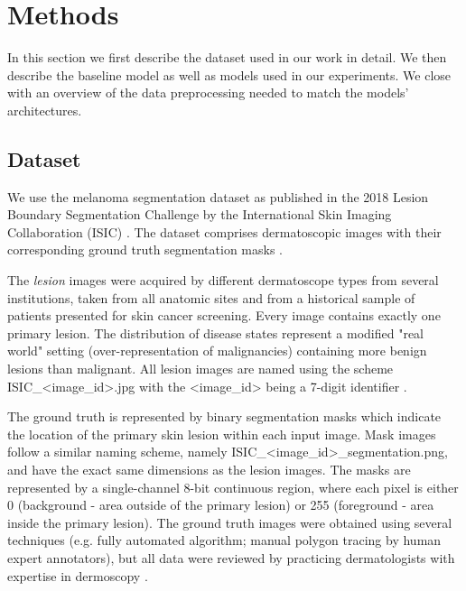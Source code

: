 \section{Methods}
In this section we first describe the dataset used in our work in detail. We then describe the baseline model as well as models used in our experiments. We close with an overview of the data preprocessing needed to match the models’ architectures.

\subsection{Dataset}
We use the melanoma segmentation dataset as published in the 2018 Lesion Boundary Segmentation Challenge by the International Skin Imaging Collaboration (ISIC) \citep{isic-2018-segmentation}. The dataset comprises dermatoscopic images with their corresponding ground truth segmentation masks \citep{ensambles-2016-codella}.

\par
The \emph{lesion} images were acquired by different dermatoscope types from several institutions, taken from all anatomic sites and from a historical sample of patients presented for skin cancer screening. Every image contains exactly one primary lesion. The distribution of disease states represent a modified "real world" setting (over-representation of malignancies) containing more benign lesions than malignant. All lesion images are named using the scheme ISIC\_\textless{image}\_id\textgreater{.jpg} with the \textless{image}\_id\textgreater{} being a 7-digit identifier \citep{isic-2018-segmentation}.

\par
The ground truth is represented by binary segmentation masks which indicate the location of the primary skin lesion within each input image. Mask images follow a similar naming scheme, namely  ISIC\_\textless{image\_id}\textgreater{\_segmentation.png}, and have the exact same dimensions as the lesion images. The masks are represented by a single-channel 8-bit continuous region, where each pixel is either 0 (background - area outside of the primary lesion) or 255 (foreground - area inside the primary lesion). The ground truth images were obtained using several techniques (e.g. fully automated algorithm; manual polygon tracing by human expert annotators), but all data were reviewed by practicing dermatologists with expertise in dermoscopy \citep{isic-2018-segmentation,ensambles-2016-codella}.

